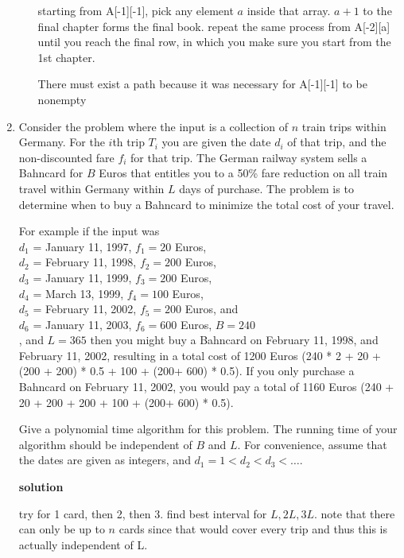 \documentclass[letterpaper,12pt]{article}
\begin{document}
\begin{enumerate}
\begin{enumerate}
starting from A[-1][-1], pick any element \(a\) inside that array. \(a+1\) to the final chapter forms the final book. repeat the same process from A[-2][a] until you reach the final row, in which you make sure you start from the 1st chapter. 

There must exist a path because it was necessary for A[-1][-1] to be nonempty




\end{enumerate}


    







\item 
Consider the problem where the input is a collection of $n$ train
trips within Germany. For the $i$th trip $T_i$ you are given the date $d_i$ of
that trip, and the non-discounted fare $f_i$ for that trip.
The German railway system sells a Bahncard for $B$ Euros that
entitles you to a 50\% fare reduction on all train travel
within Germany within $L$ days of purchase.
The problem is to determine when to buy a Bahncard to minimize the
total cost of your travel.
 
For example if the input was \\
$d_1$ = January 11, 1997, $f_1=20$ Euros, \\
$d_2$ = February 11, 1998, $f_2=200$ Euros, \\
$d_3$ = January 11, 1999, $f_3=200$ Euros, \\
$d_4$ = March 13, 1999, $f_4=100$ Euros, \\
$d_5$ = February 11, 2002, $f_5=200$ Euros, and \\
$d_6$ = January 11, 2003, $f_6=600$ Euros, $B=240$\\
, and $L=365$ then
you might buy a Bahncard on February 11, 1998, and
February 11, 2002, resulting in a total cost of
1200 Euros (240 * 2 + 20 + (200 + 200) * 0.5 + 100 + (200+ 600) * 0.5). If you only purchase a Bahncard on 
February 11, 2002, you would pay a total of 1160 Euros (240 + 20 + 200 + 200 + 100 + (200+ 600) * 0.5).
 
Give a polynomial time algorithm for this problem.
The running time of your algorithm should be independent of
$B$ and $L$. For convenience, assume that the dates are given as integers, and 
$d_1 = 1 < d_2 < d_3 < \ldots$. 



\textbf{solution}

try for 1 card, then 2, then 3. find best interval for \(L,2L,3L\). note that there can only be up to \(n\) cards since that would cover every trip and thus this is actually independent of L. 


\end{enumerate}
\end{document}
